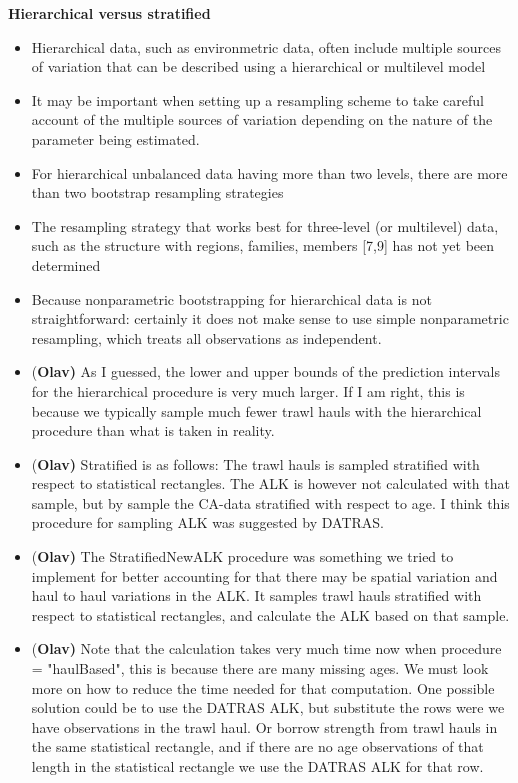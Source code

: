 \documentclass[a4paper 12pt]{article}
\numberwithin{equation}{section}
\begin{document}
{\bf Hierarchical versus stratified }

\begin{itemize}

\item Hierarchical data, such as environmetric data, often include multiple sources of variation that can be described using a hierarchical or multilevel model 
\item  It may be important when setting up a resampling scheme to take careful account of the multiple sources of variation depending on the nature of the parameter being estimated. 

\item For hierarchical unbalanced data having more than two levels, there are more than two bootstrap resampling strategies

\item  The resampling strategy that works best for three-level (or multilevel) data, such as the structure with regions, families, members [7,9] has not yet been determined

\item  Because nonparametric bootstrapping for hierarchical data is not straightforward: certainly it does not make sense to use simple nonparametric resampling, which treats all observations as independent.

\item {(\bf Olav)} As I guessed, the lower and upper bounds of the prediction intervals for the hierarchical procedure is very much larger. If I am right, this is because we typically sample much fewer trawl hauls with the hierarchical procedure than what is taken in reality.


\item {(\bf Olav)} Stratified is as follows: The trawl hauls is sampled stratified with respect to statistical rectangles. The ALK is however not calculated with that sample, but by sample the CA-data stratified with respect to age. I think this procedure for sampling ALK was suggested by DATRAS.
 
\item {(\bf Olav)} The StratifiedNewALK procedure was something we tried to implement for better accounting for that there may be spatial variation and haul to haul variations in the ALK. It samples trawl hauls stratified with respect to statistical rectangles, and calculate the ALK based on that sample.
 
\item {(\bf Olav)} Note that the calculation takes very much time now when procedure = "haulBased", this is because there are many missing ages. We must look more on how to reduce the time needed for that computation. One possible solution could be to use the DATRAS ALK, but substitute the rows were we have observations in the trawl haul. Or borrow strength from trawl hauls in the same statistical rectangle, and if there are no age observations of that length in the statistical rectangle we use the DATRAS ALK for that row.
\end{itemize}
\end{document}
